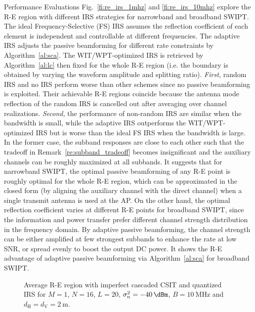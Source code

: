\documentclass[journal]{IEEEtran}
\begin{document}
\begin{section}{Performance Evaluations}
		Fig.~\ref{fi:re_irs_1mhz} and \ref{fi:re_irs_10mhz} explore the R-E region with different IRS strategies for narrowband and broadband SWIPT. The ideal Frequency-Selective (FS) IRS assumes the reflection coefficient of each element is independent and controllable at different frequencies. The adaptive IRS adjusts the passive beamforming for different rate constraints by Algorithm~\ref{al:sca}. The WIT/WPT-optimized IRS is retrieved by Algorithm~\ref{al:lc} then fixed for the whole R-E region (i.e. the boundary is obtained by varying the waveform amplitude and splitting ratio). \textit{First,} random IRS and no IRS perform worse than other schemes since no passive beamforming is exploited. Their achievable R-E regions coincide because the antenna mode reflection of the random IRS is cancelled out after averaging over channel realizations. \textit{Second,} the performance of non-random IRS are similar when the bandwidth is small, while the adaptive IRS outperforms the WIT/WPT-optimized IRS but is worse than the ideal FS IRS when the bandwidth is large. In the former case, the subband responses are close to each other such that the tradeoff in Remark~\ref{re:subband_tradeoff} becomes insignificant and the auxiliary channels can be roughly maximized at all subbands. It suggests that for narrowband SWIPT, the optimal passive beamforming of any R-E point is roughly optimal for the whole R-E region, which can be approximated in the closed form (by aligning the auxiliary channel with the direct channel) when a single transmit antenna is used at the AP. On the other hand, the optimal reflection coefficient varies at different R-E points for broadband SWIPT, since the information and power transfer prefer different channel strength distribution in the frequency domain. By adaptive passive beamforming, the channel strength can be either amplified at few strongest subbands to enhance the rate at low SNR, or spread evenly to boost the output DC power. It shows the R-E advantage of adaptive passive beamforming via Algorithm~\ref{al:sca} for broadband SWIPT.

		\begin{figure}[!t]
			\centering
			\caption{Average R-E region with imperfect cascaded CSIT and quantized IRS for $M=1$, $N=16$, $L=20$, $\sigma_n^2=\SI{-40}{\dBm}$, $B=\SI{10}{\MHz}$ and $d_{\mathrm{H}}=d_{\mathrm{V}}=\SI{2}{\meter}$.}
		\end{figure}


\end{section}
\end{document}
